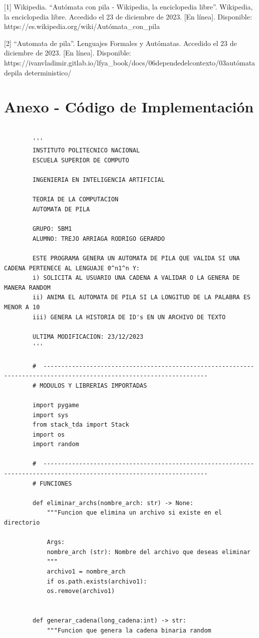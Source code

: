 \documentclass[11pt]{article} %
\begin{document}
	
	[1] Wikipedia. “Autómata con pila - Wikipedia, la enciclopedia libre”. Wikipedia, la enciclopedia libre. Accedido el 23 de diciembre de 2023. [En línea]. Disponible: https://es.wikipedia.org/wiki/Autómata\_con\_pila
	
	
	[2] “Automata de pila”. Lenguajes Formales y Autómatas. Accedido el 23 de diciembre de 2023. [En línea]. Disponible: https://ivanvladimir.gitlab.io/lfya\_book/docs/06dependedelcontexto/03autómatadepila
	deterministico/
	
	
	\newpage
	\section{Anexo - Código de Implementación}
	
	\begin{lstlisting}
	
		'''
		INSTITUTO POLITECNICO NACIONAL
		ESCUELA SUPERIOR DE COMPUTO
		
		INGENIERIA EN INTELIGENCIA ARTIFICIAL
		
		TEORIA DE LA COMPUTACION
		AUTOMATA DE PILA
		
		GRUPO: 5BM1
		ALUMNO: TREJO ARRIAGA RODRIGO GERARDO
		
		ESTE PROGRAMA GENERA UN AUTOMATA DE PILA QUE VALIDA SI UNA CADENA PERTENECE AL LENGUAJE 0^n1^n Y:
		i) SOLICITA AL USUARIO UNA CADENA A VALIDAR O LA GENERA DE MANERA RANDOM
		ii) ANIMA EL AUTOMATA DE PILA SI LA LONGITUD DE LA PALABRA ES MENOR A 10
		iii) GENERA LA HISTORIA DE ID's EN UN ARCHIVO DE TEXTO
		
		ULTIMA MODIFICACION: 23/12/2023
		'''
		
		#  --------------------------------------------------------------------------------------------------------------------
		# MODULOS Y LIBRERIAS IMPORTADAS
		
		import pygame
		import sys
		from stack_tda import Stack
		import os
		import random
		
		#  --------------------------------------------------------------------------------------------------------------------
		# FUNCIONES
		
		def eliminar_archs(nombre_arch: str) -> None:
			"""Funcion que elimina un archivo si existe en el directorio
			
			Args:
			nombre_arch (str): Nombre del archivo que deseas eliminar
			"""
			archivo1 = nombre_arch
			if os.path.exists(archivo1):
			os.remove(archivo1)
		
		
		def generar_cadena(long_cadena:int) -> str:
			"""Funcion que genera la cadena binaria random
			

\end{lstlisting}
\end{document}
